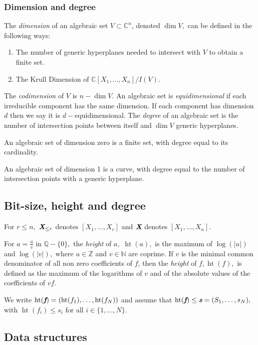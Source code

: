 \documentclass[sigconf]{acmart}
\DeclareMathOperator{\htt}{ht}
\def\C{\mathbb{C}}
\begin{document}
\subsubsection{Dimension and degree}
The \textit{dimension} of an algebraic set $V \subset \C^n$, denoted $\dim V,$ can be defined in the following ways:
%
\begin{enumerate}
    \item The number of generic hyperplanes needed to intersect with $V$ to obtain a finite set. 
    \item The Krull Dimension of $\C[X_1,\hdots,X_n]/I(V)$.
\end{enumerate}
%
The \textit{codimension} of $V$ is $n - \dim V$. An algebraic set is \textit{equidimensional} if each irreducible component has the same dimension.  If each component has dimension $d$ then we say it is $d-$equidimensional. 
The \textit{degree} of an algebraic set is the number of intersection points between itself and $\dim V$ generic hyperplanes.
%
\begin{example} 
An algebraic set of dimension zero is a finite set, with degree equal to its cardinality.
\end{example}
%
\begin{example}
An algebraic set of dimension 1 is a curve, with degree equal to the number of intersection points with a generic hyperplane.
\end{example}
%
\subsection{Bit-size, height and degree}
%
For $r \leq n,$ $\textit{\textbf{X}}_{\leq r}$ denotes $[X_1,\hdots,X_r]$ and $\textit{\textbf{X}}$ denotes $[X_1,\hdots,X_n]$. 
\par 
For $a=\frac{u}{v}$ in $\mathbb{Q}-\{0\},$ the  \textit{height} of $a,$ $\htt(a),$ is the maximum of $\log(|u|)$ and $\log(|v|),$ where $u \in \mathbb{Z}$ and $v \in \mathbb{N}$ are coprime. If $v$ is the minimal common denominator of all non zero coefficients of $f$, then the \textit{height} of $f, \htt(f),$ is defined as the maximum of the logarithms of $v$ and of the absolute values of the coefficients of $vf$. 
%
\par
We write $\htt(\textit{\textbf{f}})=(\htt(f_1),\hdots,\htt(f_N))$ and assume that $\htt(\textit{\textbf{f}}) \leq \textit{\textbf{s}} = (S_1,\hdots,s_N),$  with $\htt(f_i) \leq s_i$ for all $i \in \{ 1,\hdots,N\}.$
%
\subsection{Data structures}
%
\end{document}
